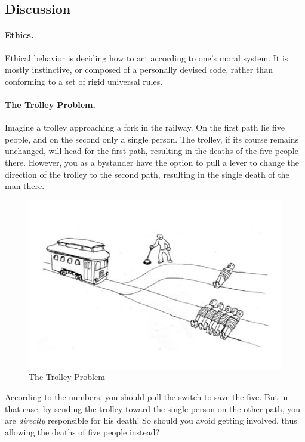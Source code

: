 \subsection{Discussion}
\paragraph{Ethics.} Ethical behavior is deciding how to act according to one's
moral system. It is mostly instinctive, or composed of a personally devised
code, rather than conforming to a set of rigid universal rules.

\paragraph{The Trolley Problem.} Imagine a trolley approaching a fork in the
railway. On the first path lie five people, and on the second only a single
person. The trolley, if its course remains unchanged, will head for the first
path, resulting in the deaths of the five people there. However, you as a
bystander have the option to pull a lever to change the direction of the trolley
to the second path, resulting in the single death of the man there.

\begin{figure}[!ht]
    \centering
    \includegraphics[width=\textwidth]{images/The_Trolley_Problem.jpg}
    \caption{The Trolley Problem} \label{fig:trolley_problem}
\end{figure}

According to the numbers, you should pull the switch to save the five. But in
that case, by sending the trolley toward the single person on the other path,
you are \textit{directly} responsible for his death! So should you avoid getting
involved, thus allowing the deaths of five people instead?

